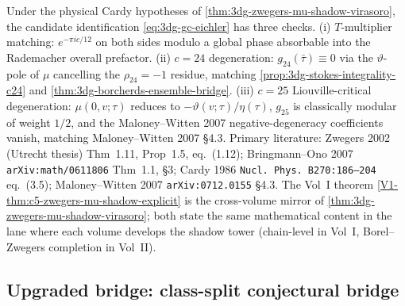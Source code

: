 \begin{remark}
\label{rem:3dg-zwegers-shadow-verification}
%
Under the physical Cardy hypotheses of
\autoref{thm:3dg-zwegers-mu-shadow-virasoro}, the candidate
identification \eqref{eq:3dg-gc-eichler} has three checks.
\textup{(i)} $T$-multiplier matching:
$e^{-\pi i c/12}$ on both sides modulo a global phase absorbable into
the Rademacher overall prefactor. \textup{(ii)} $c = 24$ degeneration:
$g_{24}(\bar\tau) \equiv 0$ via the $\vartheta$-pole of $\mu$
cancelling the $\rho_{24} = -1$ residue, matching
\autoref{prop:3dg-stokes-integrality-c24} and
\autoref{thm:3dg-borcherds-ensemble-bridge}. \textup{(iii)} $c = 25$
Liouville-critical degeneration: $\mu(0, v; \tau)$ reduces to
$-\vartheta(v;\tau)/\eta(\tau)$, $g_{25}$ is classically modular of
weight $1/2$, and the Maloney--Witten 2007 negative-degeneracy
coefficients vanish, matching Maloney--Witten 2007 \S 4.3. Primary
literature: Zwegers 2002 (Utrecht thesis) Thm~1.11, Prop~1.5,
eq.~(1.12); Bringmann--Ono 2007 \texttt{arXiv:math/0611806} Thm~1.1,
\S 3; Cardy 1986 \texttt{Nucl.\ Phys.\ B270:186--204} eq.~(3.5);
Maloney--Witten 2007 \texttt{arXiv:0712.0155} \S 4.3. The
Vol~I theorem \autoref{V1-thm:c5-zwegers-mu-shadow-explicit}
is the cross-volume mirror of
\autoref{thm:3dg-zwegers-mu-shadow-virasoro}; both state the same
mathematical content in the lane where each volume develops the
shadow tower \textup{(}chain-level in Vol~I, Borel--Zwegers completion
in Vol~II\textup{)}.
\end{remark}

\subsection{Upgraded bridge: class-split conjectural bridge}
\label{subsec:3dg-upgraded-bridge}

